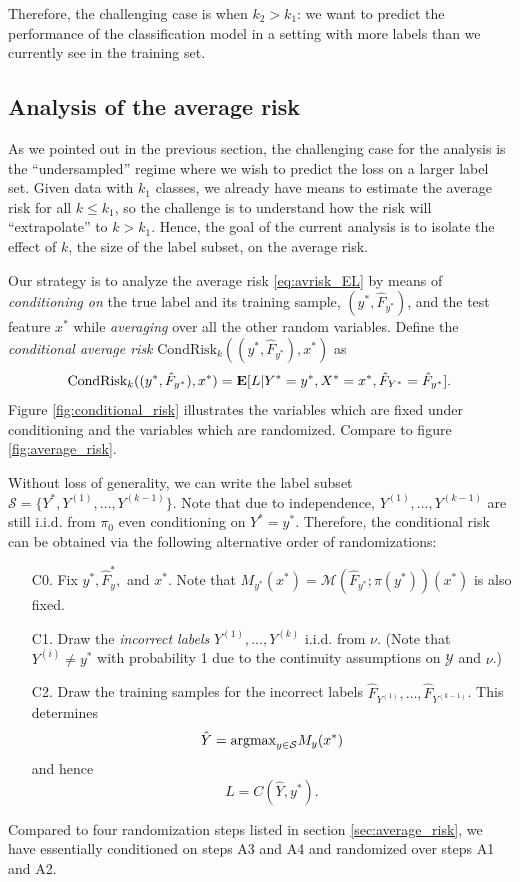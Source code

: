\documentclass[12pt]{article}
\begin{document}
Therefore, the challenging case is when $k_2 > k_1$: we want to
predict the performance of the classification model in a setting with
more labels than we currently see in the training set.

\subsection{Analysis of the average risk}

As we pointed out in the previous section, the challenging case for
the analysis is the ``undersampled'' regime where we wish to predict
the loss on a larger label set.  Given data with $k_1$ classes, we
already have means to estimate the average risk for all $k \leq k_1$,
so the challenge is to understand how the risk will ``extrapolate'' to
$k > k_1$.  Hence, the goal of the current analysis is to isolate the
effect of $k$, the size of the label subset, on the average risk.

Our strategy is to analyze the average risk \eqref{eq:avrisk_EL} by
means of \emph{conditioning on} the true label and its training
sample, $(y^*, \hat{F}_{y^*})$, and the test feature $x^*$
while \emph{averaging} over all the other random variables.  Define
the \emph{conditional average risk} $\text{CondRisk}_k((y^*, \hat{F}_{y^*}), x^*)$ as
\[
\text{CondRisk}_k((y^*, \hat{F}_{y^*}), x^*) = \textbf{E}[L|Y^*=y^*, X^* = x^*, \hat{F}_{Y^*} = \hat{F}_{y^*}].
\]
Figure \ref{fig:conditional_risk} illustrates the variables which are
fixed under conditioning and the variables which are randomized.
Compare to figure \ref{fig:average_risk}.

Without loss of generality, we can write the label subset $\mathcal{S}
= \{Y^*, Y^{(1)},\hdots, Y^{(k-1)}\}$.  Note that due to independence,
$Y^{(1)},\hdots, Y^{(k-1)}$ are still i.i.d. from $\pi_0$ even
conditioning on $Y^* = y^*.$ Therefore, the conditional risk can be
obtained via the following alternative order of randomizations:
\begin{enumerate}
\item[C0.] 
Fix $y^*, \hat{F}_y^*,$ and $x^*$.  Note that $M_{y^*}(x^*)
= \mathcal{M}(\hat{F}_{y^*}; \pi(y^*))(x^*)$ is also fixed.
\item[C1.]
Draw the \emph{incorrect labels} $Y^{(1)},\hdots, Y^{(k)}$ i.i.d. from
$\nu$.  (Note that $Y^{(i)} \neq y^*$ with probability 1 due to the
continuity assumptions on $\mathcal{Y}$ and $\nu$.)
\item[C2.]
Draw the training samples for the incorrect labels
$\hat{F}_{Y^{(1)}},\hdots, \hat{F}_{Y^{(k-1)}}$.  This determines
\[
\hat{Y} = \text{argmax}_{y \in \mathcal{S}} M_y(x^*)
\]
and hence
\[
L = C(\hat{Y}, y^*).
\]
\end{enumerate}
Compared to four randomization steps listed in
section \ref{sec:average_risk}, we have essentially conditioned on
steps A3 and A4 and randomized over steps A1 and A2.
\end{document}
